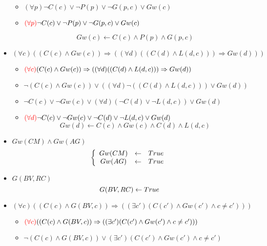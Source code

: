 \documentclass[alternative-exam.tex]{subfiles}
\begin{document}
\begin{itemize}
\begin{itemize}
\item $(\forall p) \neg C(c) \vee \neg P(p) \vee \neg G(p,c) \vee Gw(c)$

\item ${\color{red}(\forall p)} \neg C(c) \vee \neg P(p) \vee \neg G(p,c) \vee Gw(c)$

\[
Gw(c)\leftarrow C(c) \wedge P(p) \wedge G(p,c)\]
\end{itemize}
\item $(\forall c)(( C(c) \wedge Gw(c)) \Rightarrow ((\forall d)(( C(d) \wedge L(d,c)))\Rightarrow Gw(d)))$
\begin{itemize}
\item ${\color{red}(\forall c)}( C(c) \wedge Gw(c)) \Rightarrow ((\forall d)(( C(d) \wedge L(d,c)))\Rightarrow Gw(d))$

\item $\neg( C(c) \wedge Gw(c)) \vee ((\forall d)\neg(( C(d) \wedge L(d,c)))\vee Gw(d))$

\item $\neg C(c) \vee \neg Gw(c) \vee (\forall d)( \neg C(d) \vee \neg L(d,c))\vee Gw(d)$

\item ${\color{red}(\forall d)} \neg C(c) \vee \neg Gw(c) \vee \neg C(d) \vee \neg L(d,c)\vee Gw(d)$
\[
 Gw(d)\leftarrow
C(c) \wedge Gw(c) \wedge C(d) \wedge L(d,c) \]
\end{itemize}

\item $Gw(CM) \wedge Gw(AG)$
\[
\left\{
\begin{array}{c c c}
Gw(CM) &\leftarrow& True\\
Gw(AG) &\leftarrow& True\\
\end{array}
\right.
\]

\item $G(BV,RC)$
\[
G(BV,RC) \leftarrow True\\
\]

\item $(\forall c) ((C(c) \wedge G(BV,c)) \Rightarrow ((\exists c') (C(c') \wedge Gw(c') \wedge c \neq c')))$
\begin{itemize}
\item ${\color{red}(\forall c)}((C(c) \wedge G(BV,c)) \Rightarrow ((\exists c') (C(c') \wedge Gw(c') \wedge c \neq c')))$

\item $\neg (C(c) \wedge G(BV,c)) \vee (\exists c') (C(c') \wedge Gw(c') \wedge c \neq c')$


\end{itemize}
\end{itemize}
\end{document}
